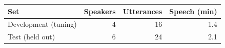 \begin{tabular}{lrrr}
\hline
\rowcolor{headfill} \textbf{Set} & \textbf{Speakers} & \textbf{Utterances} & \textbf{Speech (min)} \\ \hline
Development (tuning) & 4 & 16 & 1.4 \\ \hline
Test (held out) & 6 & 24 & 2.1 \\ \hline
\end{tabular}
